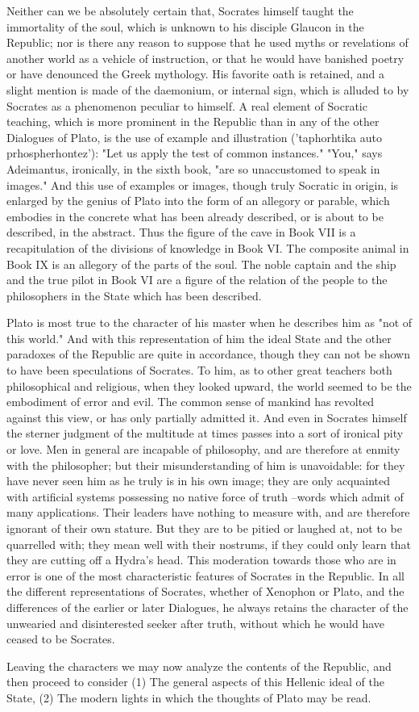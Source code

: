 Neither can we be absolutely certain that, Socrates himself taught the immortality of the soul, which is unknown to his disciple Glaucon in the Republic; nor is there any reason to suppose that he used myths or revelations of another world as a vehicle of instruction, or that he would have banished poetry or have denounced the Greek mythology. His favorite oath is retained, and a slight mention is made of the daemonium, or internal sign, which is alluded to by Socrates as a phenomenon peculiar to himself. A real element of Socratic teaching, which is more prominent in the Republic than in any of the other Dialogues of Plato, is the use of example and illustration ('taphorhtika auto prhospherhontez'): "Let us apply the test of common instances." "You," says Adeimantus, ironically, in the sixth book, "are so unaccustomed to speak in images." And this use of examples or images, though truly Socratic in origin, is enlarged by the genius of Plato into the form of an allegory or parable, which embodies in the concrete what has been already described, or is about to be described, in the abstract. Thus the figure of the cave in Book VII is a recapitulation of the divisions of knowledge in Book VI. The composite animal in Book IX is an allegory of the parts of the soul. The noble captain and the ship and the true pilot in Book VI are a figure of the relation of the people to the philosophers in the State which has been described.

Plato is most true to the character of his master when he describes him as "not of this world." And with this representation of him the ideal State and the other paradoxes of the Republic are quite in accordance, though they can not be shown to have been speculations of Socrates. To him, as to other great teachers both philosophical and religious, when they looked upward, the world seemed to be the embodiment of error and evil. The common sense of mankind has revolted against this view, or has only partially admitted it. And even in Socrates himself the sterner judgment of the multitude at times passes into a sort of ironical pity or love. Men in general are incapable of philosophy, and are therefore at enmity with the philosopher; but their misunderstanding of him is unavoidable: for they have never seen him as he truly is in his own image; they are only acquainted with artificial systems possessing no native force of truth --words which admit of many applications. Their leaders have nothing to measure with, and are therefore ignorant of their own stature. But they are to be pitied or laughed at, not to be quarrelled with; they mean well with their nostrums, if they could only learn that they are cutting off a Hydra's head. This moderation towards those who are in error is one of the most characteristic features of Socrates in the Republic. In all the different representations of Socrates, whether of Xenophon or Plato, and the differences of the earlier or later Dialogues, he always retains the character of the unwearied and disinterested seeker after truth, without which he would have ceased to be Socrates.

Leaving the characters we may now analyze the contents of the Republic, and then proceed to consider (1) The general aspects of this Hellenic ideal of the State, (2) The modern lights in which the thoughts of Plato may be read.
